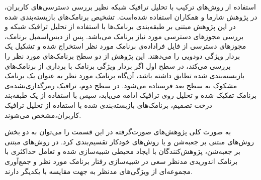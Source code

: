 استفاده از روش‌های ترکیب با تحلیل ترافیک شبکه نظیر بررسی دسترسی‌های کاربران، در پژوهش شارما و همکاران استفاده شده‌است. تشخیص برنامک‌های بازبسته‌بندی شده در این پژوهش مبتنی بر طبقه‌بندی برنامک‌ها با استفاده از تحلیل ترافیک شبکه و بررسی مجوز‌های دسترسی مورد نیاز برنامک می‌باشد. پس از دیس‌اسمبل برنامک، مجوز‌های دسترسی از فایل فراداده‌ی برنامک مورد نظر استخراج شده و تشکیل یک بردار ویژگی دودویی را می‌دهند. این پژوهش از دو سطح برنامک‌های مورد نظر را بررسی می‌کند، در سطح اول اگر بردار ویژگی برنامک با برداری از برنامک‌های بازبسته‌بندی شده تطابق داشته باشد، آن‌گاه برنامک مورد نظر به عنوان یک برنامک مشکوک به سطح بعد فرستاده می‌شود. در سطح دوم، ترافیک رمزگذاری‌نشده‌‌ی برنامک تفکیک شده و تحلیل روی ترافیک  ادامه می‌یابد، سپس با استفاده از یک طبقه‌بند درخت تصمیم، برنامک‌های بازبسته‌بندی شده با استفاده از تحلیل ترافیک کاربران،‌مشخص می‌شوند.


به صورت کلی پژوهش‌های صورت‌گرفته  در این قسمت را می‌توان به دو بخش روش‌های مبتنی بر جعبه‌شن و یا روش‌های خودکار تقسیم‌بندی کرد. در روش‌های مبتنی بر جعبه‌شن، پژوهش‌کنندگان با ایجاد محیطی شبیه‌سازی شده و تعامل حداکثری با برنامک اندوریدی مدنظر سعی در شبیه‌سازی رفتار برنامک مورد نظر و جمع‌آوری مجموعه‌ای از ویژگی‌های مدنظر به جهت مقایسه‌ با یکدیگر دارند.